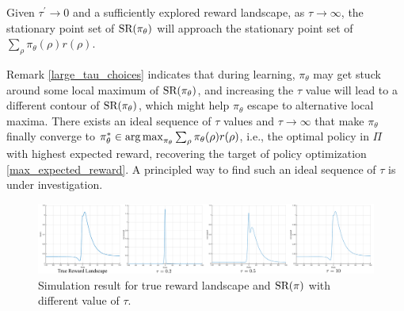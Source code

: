 \begin{remk}
\label{large_tau_choices}
	Given $\tau^{\prime} \to 0$ and a sufficiently explored reward landscape, as $\tau \to \infty$, the stationary point set of $\text{SR}(\pi_\theta)$ will approach the stationary point set of $\sum_{\rho}{ \pi_\theta(\rho) r(\rho) }$.
\end{remk}
 
Remark \ref{large_tau_choices} indicates that during learning, $\pi_\theta$ may get stuck around some local maximum of $\text{SR}(\pi_\theta)$, and increasing the $\tau$ value will lead to a different contour of $\text{SR}(\pi_\theta)$, which might help $\pi_\theta$ escape to alternative local maxima. There exists an ideal sequence of $\tau$ values and $\tau \to \infty$ that make $\pi_\theta$ finally converge to $\pi_\theta^* \in \operatorname*{arg\,max}_{\pi_\theta}{ \sum_{\rho}{\pi_\theta(\rho) r(\rho)} }$, i.e., the optimal policy in $\Pi$ with highest expected reward, recovering the target of policy optimization \cref{max_expected_reward}. A principled way to find such an ideal sequence of $\tau$ is under investigation.
 \fi
 
\begin{figure}[t]
\begin{center}
\includegraphics[width=1.0\linewidth]{./sr_simulation.pdf}
\end{center}
\caption{
Simulation result for true reward landscape and $\text{SR}(\pi)$ with different value of $\tau$.} 
\label{fig:srsimulation}
\end{figure}
 
